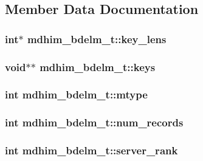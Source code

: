 \subsection{Member Data Documentation}
\hypertarget{structmdhim__bdelm__t_a12057b9c3f79456910521cd628b31415}{
\subsubsection[{key\-\_\-lens}]{\setlength{\rightskip}{0pt plus 5cm}int$\ast$ mdhim\-\_\-bdelm\-\_\-t\-::key\-\_\-lens}}\label{structmdhim__bdelm__t_a12057b9c3f79456910521cd628b31415}
\hypertarget{structmdhim__bdelm__t_a7e218a41a470e47c65040491f879985d}{
\subsubsection[{keys}]{\setlength{\rightskip}{0pt plus 5cm}void$\ast$$\ast$ mdhim\-\_\-bdelm\-\_\-t\-::keys}}\label{structmdhim__bdelm__t_a7e218a41a470e47c65040491f879985d}
\hypertarget{structmdhim__bdelm__t_a9723fe671281596fa43c80b13ea7eb9c}{
\subsubsection[{mtype}]{\setlength{\rightskip}{0pt plus 5cm}int mdhim\-\_\-bdelm\-\_\-t\-::mtype}}\label{structmdhim__bdelm__t_a9723fe671281596fa43c80b13ea7eb9c}
\hypertarget{structmdhim__bdelm__t_a3a51d42f3dee8ffd91aa208cdd2be0a3}{
\subsubsection[{num\-\_\-records}]{\setlength{\rightskip}{0pt plus 5cm}int mdhim\-\_\-bdelm\-\_\-t\-::num\-\_\-records}}\label{structmdhim__bdelm__t_a3a51d42f3dee8ffd91aa208cdd2be0a3}
\hypertarget{structmdhim__bdelm__t_a5c455aeb5d7804c4d448d5b3f624c6e6}{
\subsubsection[{server\-\_\-rank}]{\setlength{\rightskip}{0pt plus 5cm}int mdhim\-\_\-bdelm\-\_\-t\-::server\-\_\-rank}}\label{structmdhim__bdelm__t_a5c455aeb5d7804c4d448d5b3f624c6e6}
